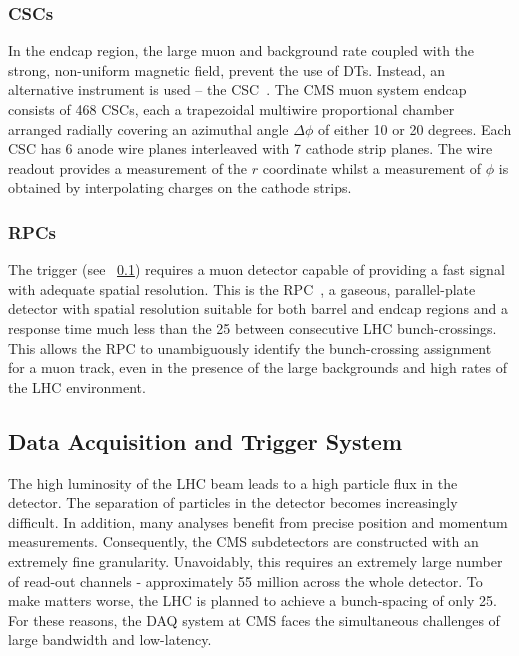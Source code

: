 \subsubsection{\aclp{CSC}}
In the endcap region, the large muon and background rate coupled with the
strong, non-uniform magnetic field, prevent the use of \acp{DT}. Instead, an
alternative instrument is used -- the \ac{CSC}~\cite{csc_paper}. The CMS muon
system endcap consists of 468 \acp{CSC}, each a trapezoidal multiwire
proportional chamber arranged radially covering an azimuthal angle $\Delta\phi$
of either 10 or 20 degrees. Each \ac{CSC} has 6 anode wire planes interleaved with 7 cathode strip planes. The wire
readout provides a measurement of the $r$ coordinate whilst a measurement of
$\phi$ is obtained by interpolating charges on the cathode strips.

\subsubsection{\aclp{RPC}}
The trigger (see \sec~\ref{sec:trigger}) requires a muon detector capable of
providing a fast signal with adequate spatial resolution. This is the
\acf{RPC}~\cite{rpc_paper}, a gaseous, parallel-plate detector with spatial
resolution suitable for both barrel and endcap regions and a response time much
less than the \unit{25}{\nano\second} between consecutive \ac{LHC}
bunch-crossings. This allows the \ac{RPC} to unambiguously identify the
bunch-crossing assignment for a muon track, even in the presence of the large
backgrounds and high rates of the \ac{LHC} environment.

\subsection{Data Acquisition and Trigger System}
\label{sec:trigger}
The high luminosity of the \ac{LHC} beam leads to a high particle flux in the
detector. The separation of particles in the detector becomes increasingly
difficult. In addition, many analyses benefit from precise position and momentum
measurements. Consequently, the \ac{CMS} subdetectors are constructed with an
extremely fine granularity. Unavoidably, this requires an extremely large number
of read-out channels - approximately 55 million across the whole detector. To
make matters worse, the \ac{LHC} is planned to achieve a bunch-spacing of only
\unit{25}{\nano\second}. For these reasons, the \ac{DAQ} system at \ac{CMS}
faces the simultaneous challenges of large bandwidth and low-latency.

